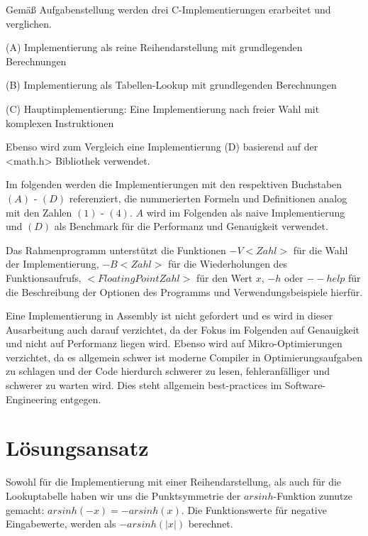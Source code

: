 \documentclass[course=erap] {aspdoc}
\begin{document}
    Gemäß Aufgabenstellung werden drei C-Implementierungen erarbeitet und verglichen.


    (A) Implementierung als reine Reihendarstellung mit grundlegenden Berechnungen


    (B) Implementierung als Tabellen-Lookup mit grundlegenden Berechnungen


    (C) Hauptimplementierung: Eine Implementierung nach freier Wahl mit komplexen Instruktionen

    Ebenso wird zum Vergleich eine Implementierung (D) basierend auf der <math.h> Bibliothek verwendet.

    Im folgenden werden die Implementierungen mit den respektiven Buchstaben $(A)$ - $(D)$ referenziert, die nummerierten Formeln und Definitionen analog mit den Zahlen $(1)$ - $(4)$. 
    $A$ wird im Folgenden als naive Implementierung und $(D)$ als Benchmark für die Performanz und Genauigkeit verwendet. 


    Das Rahmenprogramm unterstützt die Funktionen $-V<Zahl>$ für die Wahl der Implementierung, $-B<Zahl>$ für die Wiederholungen des Funktionsaufrufs, $<Floating Point Zahl>$ für den Wert $x$, $-h$ oder $--help$ für die Beschreibung der Optionen des Programms und Verwendungsbeispiele hierfür.
   

    Eine Implementierung in Assembly ist nicht gefordert und es wird in dieser Ausarbeitung auch darauf verzichtet, da der Fokus im Folgenden auf Genauigkeit und nicht auf Performanz liegen wird.
    Ebenso wird auf Mikro-Optimierungen verzichtet, da es allgemein schwer ist moderne Compiler in Optimierungsaufgaben zu schlagen und der Code hierdurch schwerer zu lesen, fehleranfälliger und schwerer zu warten wird.
    Dies steht allgemein best-practices im Software-Engineering entgegen.


    \section{Lösungsansatz}

    Sowohl für die Implementierung mit einer Reihendarstellung, als auch für die Lookuptabelle haben wir uns die Punktsymmetrie der $arsinh$-Funktion zunutze gemacht: $arsinh(-x) = -arsinh(x)$. Die Funktionswerte für negative Eingabewerte, werden als $-arsinh(|x|)$ berechnet.
\end{document}
